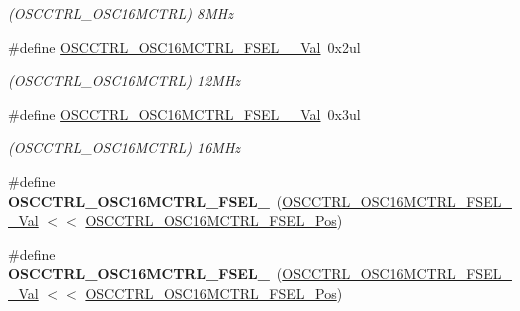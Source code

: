 \begin{DoxyCompactItemize}
\begin{DoxyCompactList}\small\item\em (O\+S\+C\+C\+T\+R\+L\+\_\+\+O\+S\+C16\+M\+C\+T\+R\+L) 8\+M\+Hz \end{DoxyCompactList}\item 
\hypertarget{group___s_a_m_l21___o_s_c_c_t_r_l_ga9097e04b6992fd931c676431881a23a0}{}\#define \hyperlink{group___s_a_m_l21___o_s_c_c_t_r_l_ga9097e04b6992fd931c676431881a23a0}{O\+S\+C\+C\+T\+R\+L\+\_\+\+O\+S\+C16\+M\+C\+T\+R\+L\+\_\+\+F\+S\+E\+L\+\_\+\_\+\+Val}~0x2ul\label{group___s_a_m_l21___o_s_c_c_t_r_l_ga9097e04b6992fd931c676431881a23a0}

\begin{DoxyCompactList}\small\item\em (O\+S\+C\+C\+T\+R\+L\+\_\+\+O\+S\+C16\+M\+C\+T\+R\+L) 12\+M\+Hz \end{DoxyCompactList}\item 
\hypertarget{group___s_a_m_l21___o_s_c_c_t_r_l_gace6ca7bbfea5731200a559cb2c9814e2}{}\#define \hyperlink{group___s_a_m_l21___o_s_c_c_t_r_l_gace6ca7bbfea5731200a559cb2c9814e2}{O\+S\+C\+C\+T\+R\+L\+\_\+\+O\+S\+C16\+M\+C\+T\+R\+L\+\_\+\+F\+S\+E\+L\+\_\+\_\+\+Val}~0x3ul\label{group___s_a_m_l21___o_s_c_c_t_r_l_gace6ca7bbfea5731200a559cb2c9814e2}

\begin{DoxyCompactList}\small\item\em (O\+S\+C\+C\+T\+R\+L\+\_\+\+O\+S\+C16\+M\+C\+T\+R\+L) 16\+M\+Hz \end{DoxyCompactList}\item 
\hypertarget{group___s_a_m_l21___o_s_c_c_t_r_l_gae595dbe477b80d042ae0ea5fc88ff295}{}\#define {\bfseries O\+S\+C\+C\+T\+R\+L\+\_\+\+O\+S\+C16\+M\+C\+T\+R\+L\+\_\+\+F\+S\+E\+L\+\_}~(\hyperlink{group___s_a_m_l21___o_s_c_c_t_r_l_ga324709e0ecbff75960be0ff803f9b409}{O\+S\+C\+C\+T\+R\+L\+\_\+\+O\+S\+C16\+M\+C\+T\+R\+L\+\_\+\+F\+S\+E\+L\+\_\+\_\+\+Val} $<$$<$ \hyperlink{group___s_a_m_l21___o_s_c_c_t_r_l_gab65dca33592ddda96df4de27654a4869}{O\+S\+C\+C\+T\+R\+L\+\_\+\+O\+S\+C16\+M\+C\+T\+R\+L\+\_\+\+F\+S\+E\+L\+\_\+\+Pos})\label{group___s_a_m_l21___o_s_c_c_t_r_l_gae595dbe477b80d042ae0ea5fc88ff295}

\item 
\hypertarget{group___s_a_m_l21___o_s_c_c_t_r_l_ga8a2e3a9cec09630f41b6e1fa6134386e}{}\#define {\bfseries O\+S\+C\+C\+T\+R\+L\+\_\+\+O\+S\+C16\+M\+C\+T\+R\+L\+\_\+\+F\+S\+E\+L\+\_}~(\hyperlink{group___s_a_m_l21___o_s_c_c_t_r_l_gaad8e721a7ea4d11d0d2d0afe288d190e}{O\+S\+C\+C\+T\+R\+L\+\_\+\+O\+S\+C16\+M\+C\+T\+R\+L\+\_\+\+F\+S\+E\+L\+\_\+\_\+\+Val} $<$$<$ \hyperlink{group___s_a_m_l21___o_s_c_c_t_r_l_gab65dca33592ddda96df4de27654a4869}{O\+S\+C\+C\+T\+R\+L\+\_\+\+O\+S\+C16\+M\+C\+T\+R\+L\+\_\+\+F\+S\+E\+L\+\_\+\+Pos})\label{group___s_a_m_l21___o_s_c_c_t_r_l_ga8a2e3a9cec09630f41b6e1fa6134386e}


\end{DoxyCompactItemize}
